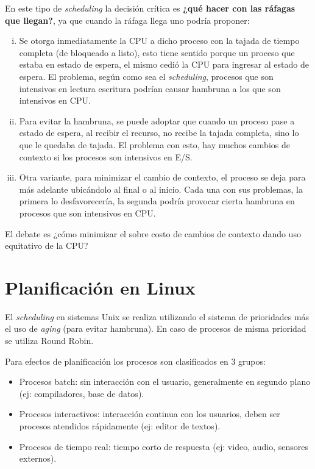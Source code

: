 En este tipo de \textit{scheduling} la decisión crítica es \textbf{¿qué hacer
con las ráfagas que llegan?}, ya que cuando la ráfaga llega uno podría proponer:

\begin{enumerate}[i.]

\item Se otorga inmediatamente la CPU a dicho proceso con la tajada de tiempo
completa (de bloqueado a listo), esto tiene sentido porque un proceso que estaba
en estado de espera, el mismo cedió la CPU para ingresar al estado de espera. El
problema, según como sea el \textit{scheduling}, procesos que son intensivos en
lectura escritura podrían causar hambruna a los que son intensivos en CPU.

\item Para evitar la hambruna, se puede adoptar que cuando un proceso pase a
estado de espera, al recibir el recurso, no recibe la tajada completa, sino lo
que le quedaba de tajada. El problema con esto, hay muchos cambios de contexto
si los procesos son intensivos en E/S.

\item Otra variante, para minimizar el cambio de contexto, el proceso se deja
para más adelante ubicándolo al final o al inicio. Cada una con sus problemas,
la primera lo desfavorecería, la segunda podría provocar cierta hambruna en
procesos que son intensivos en CPU.

\end{enumerate}

El debate es ¿cómo minimizar el sobre costo de cambios de contexto dando uso
equitativo de la CPU?

\section{Planificación en Linux}
El \textit{scheduling} en sistemas Unix se realiza utilizando el sistema de
prioridades más el uso de \textit{aging} (para evitar hambruna). En caso de
procesos de misma prioridad se utiliza Round Robin.

Para efectos de planificación los procesos son clasificados en 3 grupos:
\begin{itemize}
\item Procesos batch: sin interacción con el usuario, generalmente en segundo
plano (ej: compiladores, base de datos).
\item Procesos interactivos: interacción continua con los usuarios, deben ser
procesos atendidos rápidamente (ej: editor de textos).
\item Procesos de tiempo real: tiempo corto de respuesta (ej: video, audio,
sensores externos).
\end{itemize}

